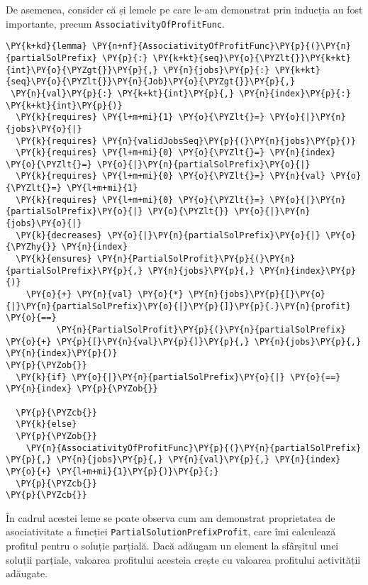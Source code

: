 De asemenea, consider că și lemele pe care le-am demonstrat prin inducția au fost importante, precum \texttt{AssociativityOfProfitFunc}.

\begin{Verbatim}[commandchars=\\\{\},fontsize=\footnotesize]
\PY{k+kd}{lemma} \PY{n+nf}{AssociativityOfProfitFunc}\PY{p}{(}\PY{n}{partialSolPrefix} \PY{p}{:} \PY{k+kt}{seq}\PY{o}{\PYZlt{}}\PY{k+kt}{int}\PY{o}{\PYZgt{}}\PY{p}{,} \PY{n}{jobs}\PY{p}{:} \PY{k+kt}{seq}\PY{o}{\PYZlt{}}\PY{n}{Job}\PY{o}{\PYZgt{}}\PY{p}{,}
 \PY{n}{val}\PY{p}{:} \PY{k+kt}{int}\PY{p}{,} \PY{n}{index}\PY{p}{:} \PY{k+kt}{int}\PY{p}{)}
  \PY{k}{requires} \PY{l+m+mi}{1} \PY{o}{\PYZlt{}=} \PY{o}{|}\PY{n}{jobs}\PY{o}{|}
  \PY{k}{requires} \PY{n}{validJobsSeq}\PY{p}{(}\PY{n}{jobs}\PY{p}{)}
  \PY{k}{requires} \PY{l+m+mi}{0} \PY{o}{\PYZlt{}=} \PY{n}{index} \PY{o}{\PYZlt{}=} \PY{o}{|}\PY{n}{partialSolPrefix}\PY{o}{|}
  \PY{k}{requires} \PY{l+m+mi}{0} \PY{o}{\PYZlt{}=} \PY{n}{val} \PY{o}{\PYZlt{}=} \PY{l+m+mi}{1}
  \PY{k}{requires} \PY{l+m+mi}{0} \PY{o}{\PYZlt{}=} \PY{o}{|}\PY{n}{partialSolPrefix}\PY{o}{|} \PY{o}{\PYZlt{}} \PY{o}{|}\PY{n}{jobs}\PY{o}{|} 
  \PY{k}{decreases} \PY{o}{|}\PY{n}{partialSolPrefix}\PY{o}{|} \PY{o}{\PYZhy{}} \PY{n}{index}
  \PY{k}{ensures} \PY{n}{PartialSolProfit}\PY{p}{(}\PY{n}{partialSolPrefix}\PY{p}{,} \PY{n}{jobs}\PY{p}{,} \PY{n}{index}\PY{p}{)} 
    \PY{o}{+} \PY{n}{val} \PY{o}{*} \PY{n}{jobs}\PY{p}{[}\PY{o}{|}\PY{n}{partialSolPrefix}\PY{o}{|}\PY{p}{]}\PY{p}{.}\PY{n}{profit} \PY{o}{==}
          \PY{n}{PartialSolProfit}\PY{p}{(}\PY{n}{partialSolPrefix} \PY{o}{+} \PY{p}{[}\PY{n}{val}\PY{p}{]}\PY{p}{,} \PY{n}{jobs}\PY{p}{,} \PY{n}{index}\PY{p}{)}
\PY{p}{\PYZob{}}
  \PY{k}{if} \PY{o}{|}\PY{n}{partialSolPrefix}\PY{o}{|} \PY{o}{==} \PY{n}{index} \PY{p}{\PYZob{}}

  \PY{p}{\PYZcb{}}
  \PY{k}{else}
  \PY{p}{\PYZob{}}
    \PY{n}{AssociativityOfProfitFunc}\PY{p}{(}\PY{n}{partialSolPrefix} \PY{p}{,} \PY{n}{jobs}\PY{p}{,} \PY{n}{val}\PY{p}{,} \PY{n}{index} \PY{o}{+} \PY{l+m+mi}{1}\PY{p}{)}\PY{p}{;}
  \PY{p}{\PYZcb{}}
\PY{p}{\PYZcb{}}
\end{Verbatim}

În cadrul acestei leme se poate observa cum am demonstrat proprietatea de asociativitate a funcției  \texttt{PartialSolutionPrefixProfit}, care îmi calculează profitul pentru o soluție parțială. Dacă adăugam un element la sfârșitul unei soluții parțiale, valoarea profitului acesteia crește cu valoarea profitului activității adăugate. 
\\

